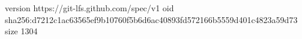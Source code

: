version https://git-lfs.github.com/spec/v1
oid sha256:d7212c1ac63565ef9b10760f5b6d6ac40893fd572166b5559d401c4823a59d73
size 1304
